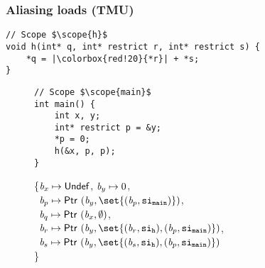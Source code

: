 \begin{frame}[fragile]
\frametitle{Aliasing loads (TMU)}
\begin{verbatim}
// Scope $\scope{h}$
void h(int* q, int* restrict r, int* restrict s) {
    *q = |\colorbox{red!20}{*r}| + *s; 
}
\end{verbatim}
\vspace*{-1cm}
\begin{figure}[!h]
\begin{minipage}[t]{.36\textwidth}

\begin{verbatim}
// Scope $\scope{main}$
int main() {
    int x, y;
    int* restrict p = &y;
    *p = 0;
    h(&x, p, p);
}
\end{verbatim}
\end{minipage}%
\begin{minipage}{.64\textwidth}
\executionannotation
{
\{$\textit{b}_x \mapsto \mathsf{Undef}$, $\textit{b}_y \mapsto 0$, \\
    \ $\Blockvar_p \mapsto \ptr{(\Blockvar_y, \set{(\Blockvar_p, \scope{main})})}$, \\
    \ $\textit{b}_q \mapsto \mathsf{Ptr} \ (\textit{b}_x, \emptyset)$, \\
    \ $\Blockvar_r \mapsto \ptr{(\Blockvar_y, \set{(\Blockvar_r, \scope{h}), (\Blockvar_p, \scope{main})})} $, \\
    \ $\Blockvar_s \mapsto \ptr{(\Blockvar_y, \set{(\Blockvar_s, \scope{h}), (\Blockvar_p, \scope{main})})} $ \\
\}
}
{
}
\end{minipage}
\end{figure}

\end{frame}



